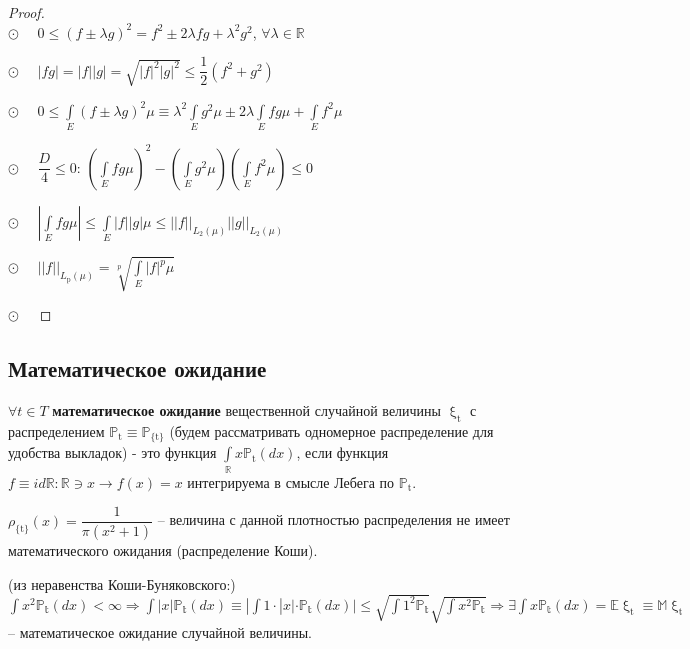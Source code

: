 \begin{proof} 
\ \\
\indent$\odot\quad$ $0 \leqslant (f \pm \lambda g)^2 = f^2 \pm 2 \lambda fg + \lambda^2 g^2$, $\forall \lambda \in \mathds{R}$

$\odot\quad$ $|fg| = |f||g| = \sqrt{|f|^2 |g|^2} \leqslant \dfrac{1}{2} (f^2 + g^2)$

$\odot\quad$ $0 \leqslant \int\limits_{E}^{} (f \pm \lambda g)^2 \mu \equiv \lambda^2 \int\limits_{E}^{} g^2 \mu \pm 2\lambda \int\limits_{E}^{} fg \mu + \int\limits_{E}^{} f^2 \mu$ 

$\odot\quad$ $\dfrac{D}{4} \leqslant 0$: $(\int\limits_{E}^{} fg \mu)^2 - (\int\limits_{E}^{} g^2 \mu)(\int\limits_{E}^{} f^2 \mu) \leqslant 0$

$\odot\quad$ \quad $|\int\limits_{E}^{} fg \mu| \leqslant \int\limits_{E}^{} |f||g| \mu \leqslant ||f||_{L_{2} (\mu)}||g||_{L_{2} (\mu)}$

$\odot\quad$ $||f||_{L_{\text{p}} (\mu)} = \sqrt[p]{\int\limits_{E}^{} |f|^p \mu}$

$\odot\quad$  
\end{proof}

\subsection{Математическое ожидание}

\cite{ShamarovDRP11} $\forall t \in T$ \textbf{математическое ожидание} вещественной случайной величины $\upxi_\text{t}$ с распределением $\mathds{P}_\text{t} \equiv \mathds{P}_\text{\{t\}}$ (будем рассматривать одномерное распределение для удобства выкладок) - это функция $\int\limits_{\mathds{R}}^{} x\mathds{P}_\text{t}(dx)$, если функция $f \equiv id\mathds{R}: \mathds{R} \ni x \rightarrow f(x) = x$ интегрируема в смысле Лебега по $\mathds{P}_\text{t}$.

\begin{example}$\rho_\text{\{t\}} (x) = \dfrac{1}{\pi (x^2 + 1)}$ -- величина с данной плотностью распределения не имеет математического ожидания (распределение Коши).
\end{example}


\begin{corollary}(из неравенства Коши-Буняковского:) $\int x^2 \mathds{P_\text{t}} (dx) < \infty \Longrightarrow \int |x| \mathds{P_\text{t}} (dx) \equiv |\int 1 \cdot |x| \cdot \mathds{P_\text{t}} (dx)| \leqslant \sqrt{\int 1^2 \mathds{P_\text{t}}} \sqrt{\int x^2 \mathds{P_\text{t}}} \Longrightarrow \exists \int x \mathds{P_\text{t}} (dx) = \mathds{E}\upxi_\text{t} \equiv \mathds{M}\upxi_\text{t}$ -- математическое ожидание случайной величины.
\end{corollary}

